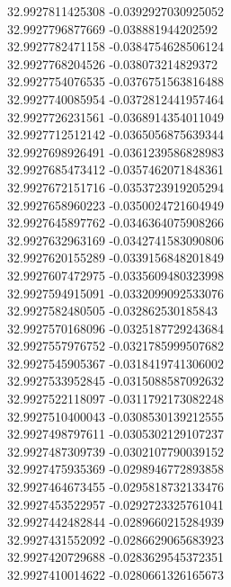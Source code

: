 {32.9927811425308	-0.0392927030925052\\
32.9927796877669	-0.038881944202592\\
32.9927782471158	-0.0384754628506124\\
32.9927768204526	-0.038073214829372\\
32.9927754076535	-0.0376751563816488\\
32.9927740085954	-0.0372812441957464\\
32.9927726231561	-0.0368914354011049\\
32.9927712512142	-0.0365056875639344\\
32.9927698926491	-0.0361239586828983\\
32.9927685473412	-0.0357462071848361\\
32.9927672151716	-0.0353723919205294\\
32.9927658960223	-0.0350024721604949\\
32.9927645897762	-0.0346364075908266\\
32.9927632963169	-0.0342741583090806\\
32.9927620155289	-0.0339156848201849\\
32.9927607472975	-0.0335609480323998\\
32.9927594915091	-0.0332099092533076\\
32.9927582480505	-0.032862530185843\\
32.9927570168096	-0.0325187729243684\\
32.9927557976752	-0.0321785999507682\\
32.9927545905367	-0.0318419741306002\\
32.9927533952845	-0.0315088587092632\\
32.9927522118097	-0.0311792173082248\\
32.9927510400043	-0.0308530139212555\\
32.9927498797611	-0.0305302129107237\\
32.9927487309739	-0.0302107790039152\\
32.9927475935369	-0.0298946772893858\\
32.9927464673455	-0.0295818732133476\\
32.9927453522957	-0.0292723325761041\\
32.9927442482844	-0.0289660215284939\\
32.9927431552092	-0.0286629065683923\\
32.9927420729688	-0.0283629545372351\\
32.9927410014622	-0.0280661326165673\\
}
